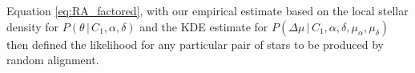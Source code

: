 \documentclass[usenatbib]{mnras}
\newcommand{\given}{\,|\,}
\newcommand{\dd}{\mathrm{d}}
\begin{document}
\begin{comment}
The last two integrals in Equation \ref{eq:RA_factored} account for uncertainties in each of the astrometric parallax measurements. We assume that Lutz-Kelker bias \citep{lutz73} needs to be taken into account, therefore:
\begin{equation}
P(\pi) \propto \pi^4.
\end{equation}
Observational uncertainties on the parallax are assumed to be Gaussian:
\begin{equation}
P(\pi' \given \pi) = \mathcal{N}(\pi'; \pi, \sigma_{\pi}). 
\end{equation}
\end {comment}


Equation \ref{eq:RA_factored}, with our empirical estimate based on the local stellar density for $P(\theta \given C_1, \alpha, \delta)$ and the KDE estimate for $P(\Delta \mu \given C_1, \alpha, \delta, \mu_{\alpha}, \mu_{\delta})$ then defined the likelihood for any particular pair of stars to be produced by random alignment.



\begin{comment}
With a detailed knowledge of the three-dimensional stellar density, proper motion distribution as a function of spatial position, and completeness function of the Gaia-TYCHO-2 sample, one could determine $P(\theta, \Delta \mu, \Delta D' \given C_1, \alpha, \delta, \mu_{\alpha}, \mu_{\delta}, D )$ for any arbitrary pair of stars. However, this is a function with complex dependencies that we are not prepared to address here. Instead, we can empirically approximate this probability for every pair of stars in our data set. First, we express $\mu$ as $V_{\rm pec}$ (to remove the correlation between proper motion and distance), and then separate the terms in the probability:
\begin{eqnarray}
P(\theta, \Delta \mu, \Delta D' \given C_1, \alpha, \delta, \mu_{\alpha}, \mu_{\delta}, D ) &=& P(\theta, \Delta V_{\rm pec}, \Delta D' \given C_1, \alpha, \delta, \mu_{\alpha}, \mu_{\delta}, D ) \left| \frac{\dd \Delta V_{\rm pec}}{\dd \Delta \mu} \right| \label{eq:P_obs_noise} \\
&=& P(\theta \given \alpha, \delta) 
  P(\Delta V_{\rm pec} \given \alpha, \delta, \mu_{\alpha}, \mu_{\delta}) \nonumber \\
  & & \qquad \times  P(\Delta D' \given \alpha, \delta, D) \left| \frac{\dd \Delta V_{\rm pec}}{\dd \Delta \mu} \right|. \label{eq:P_obs_noise_split} 
\end{eqnarray}


\end{comment}
\end{document}
